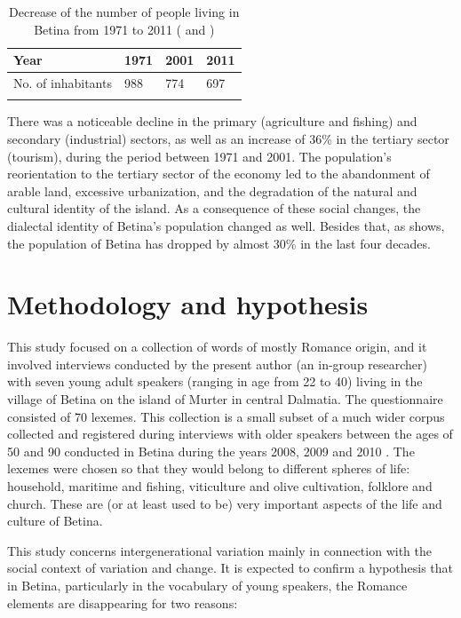 \documentclass[output=paper]{LSP/langsci}
\begin{document}
\begin{table}
\begin{tabular}{llll}
\lsptoprule
Year & 1971 & 2001 & 2011\\
\midrule
No.  of inhabitants & 988 & 774 & 697\\
\lspbottomrule
\end{tabular}
\caption{Decrease of the number of people living in Betina from 1971 to 2011 (\citealt[15]{skracic_otok_2010} and \citealt{drzavni_zavod_za_statistiku_republike_hrvatske_1})}
\label{tab:skevin:2}
\end{table}

There was a noticeable decline in the primary (agriculture and fishing) and secondary (industrial) sectors, as well as an increase of 36\% in the tertiary sector (tourism), during the period between 1971 and 2001. The population’s reorientation to the tertiary sector of the economy led to the abandonment of arable land, excessive urbanization, and the degradation of the natural and cultural identity of the island. As a consequence of these social changes, the dialectal identity of Betina’s population changed as well. Besides that, as  shows, the population of Betina has dropped by almost 30\% in the last four decades.

\section{Methodology and hypothesis}
This study focused on a collection of words of mostly Romance origin, and it involved interviews conducted by the present author (an in-group researcher) with seven young adult speakers (ranging in age from 22 to 40) living in the village of Betina on the island of Murter in central Dalmatia. The questionnaire consisted of 70 lexemes. This collection is a small subset of a much wider corpus collected and registered during interviews with older speakers between the ages of 50 and 90 conducted in Betina during the years 2008, 2009 and 2010 \citep{skevin_etimoloska_2010}. The lexemes were chosen so that they would belong to different spheres of life: household, maritime and fishing, viticulture and olive cultivation, folklore and church. These are (or at least used to be) very important aspects of the life and culture of Betina. 

This study concerns intergenerational variation mainly in connection with the social context of variation and change. It is expected to confirm a hypothesis that in Betina, particularly in the vocabulary of young speakers, the Romance elements are disappearing for two reasons: 
\end{document}
